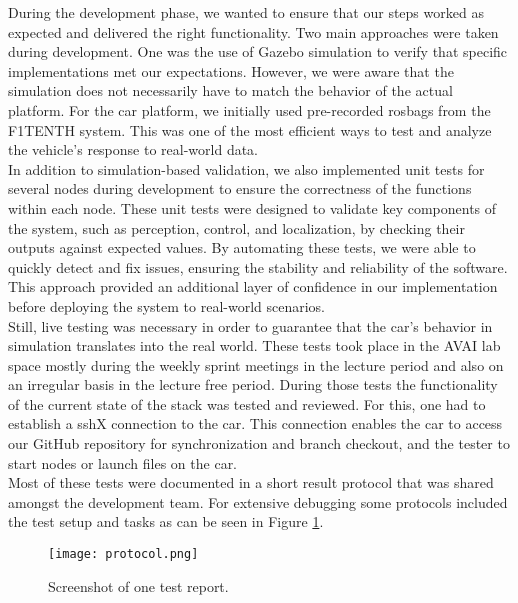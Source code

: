 During the development phase, we wanted to ensure that our steps worked as expected and delivered the right functionality. Two main approaches were taken during development. One was the use of Gazebo simulation to verify that specific implementations met our expectations. However, we were aware that the simulation does not necessarily have to match the behavior of the actual platform. For the car platform, we initially used pre-recorded rosbags from the F1TENTH system. This was one of the most efficient ways to test and analyze the vehicle’s response to real-world data.\\
\newline
In addition to simulation-based validation, we also implemented unit tests for several nodes during development to ensure the correctness of the functions within each node. These unit tests were designed to validate key components of the system, such as perception, control, and localization, by checking their outputs against expected values. By automating these tests, we were able to quickly detect and fix issues, ensuring the stability and reliability of the software. This approach provided an additional layer of confidence in our implementation before deploying the system to real-world scenarios.\\
\newline
Still, live testing was necessary in order to guarantee that the car's behavior in simulation translates into the real world. These tests took place in the AVAI lab space mostly during the weekly sprint meetings in the lecture period and also on an irregular basis in the lecture free period. During those tests the functionality of the current state of the stack was tested and reviewed. For this, one had to establish a sshX connection to the car. This connection enables the car to access our GitHub repository for synchronization and branch checkout, and the tester to start nodes or launch files on the car. \\
\newline
Most of these tests were documented in a short result protocol that was shared amongst the development team. For extensive debugging some protocols included the test setup and tasks as can be seen in Figure \ref{fig:protocol}.

\begin{figure}[htp]
	\vskip 0.2in
	\begin{center}
		\centerline{\texttt{[image: protocol.png]}}
		\caption{Screenshot of one test report.}
		\label{fig:protocol}
	\end{center}
	\vskip -0.2in
\end{figure}
